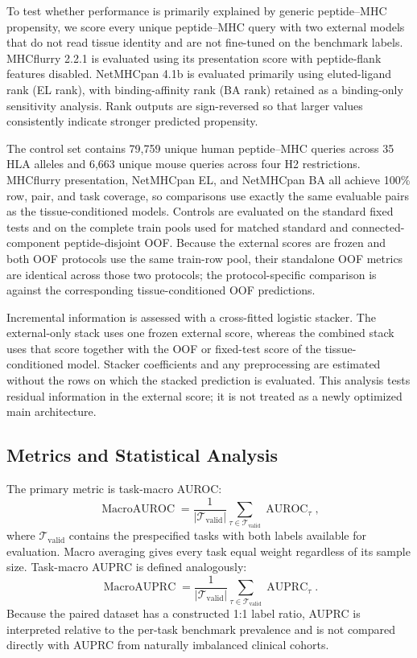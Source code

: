 To test whether performance is primarily explained by generic peptide--MHC propensity, we score every unique peptide--MHC query with two external models that do not read tissue identity and are not fine-tuned on the benchmark labels. MHCflurry 2.2.1 \cite{odonnell2020mhcflurry} is evaluated using its presentation score with peptide-flank features disabled. NetMHCpan 4.1b \cite{reynisson2020netmhcpan} is evaluated primarily using eluted-ligand rank (EL rank), with binding-affinity rank (BA rank) retained as a binding-only sensitivity analysis. Rank outputs are sign-reversed so that larger values consistently indicate stronger predicted propensity.

The control set contains 79,759 unique human peptide--MHC queries across 35 HLA alleles and 6,663 unique mouse queries across four H2 restrictions. MHCflurry presentation, NetMHCpan EL, and NetMHCpan BA all achieve 100\% row, pair, and task coverage, so comparisons use exactly the same evaluable pairs as the tissue-conditioned models. Controls are evaluated on the standard fixed tests and on the complete train pools used for matched standard and connected-component peptide-disjoint OOF. Because the external scores are frozen and both OOF protocols use the same train-row pool, their standalone OOF metrics are identical across those two protocols; the protocol-specific comparison is against the corresponding tissue-conditioned OOF predictions.

Incremental information is assessed with a cross-fitted logistic stacker. The external-only stack uses one frozen external score, whereas the combined stack uses that score together with the OOF or fixed-test score of the tissue-conditioned model. Stacker coefficients and any preprocessing are estimated without the rows on which the stacked prediction is evaluated. This analysis tests residual information in the external score; it is not treated as a newly optimized main architecture.

\subsection{Metrics and Statistical Analysis}

The primary metric is task-macro AUROC:
\[
\operatorname{MacroAUROC}
=
\frac{1}{|\mathcal{T}_{\mathrm{valid}}|}
\sum_{\tau\in\mathcal{T}_{\mathrm{valid}}}
\operatorname{AUROC}_{\tau},
\]
where \(\mathcal{T}_{\mathrm{valid}}\) contains the prespecified tasks with both labels available for evaluation. Macro averaging gives every task equal weight regardless of its sample size. Task-macro AUPRC is defined analogously:
\[
\operatorname{MacroAUPRC}
=
\frac{1}{|\mathcal{T}_{\mathrm{valid}}|}
\sum_{\tau\in\mathcal{T}_{\mathrm{valid}}}
\operatorname{AUPRC}_{\tau}.
\]
Because the paired dataset has a constructed 1:1 label ratio, AUPRC is interpreted relative to the per-task benchmark prevalence and is not compared directly with AUPRC from naturally imbalanced clinical cohorts.

